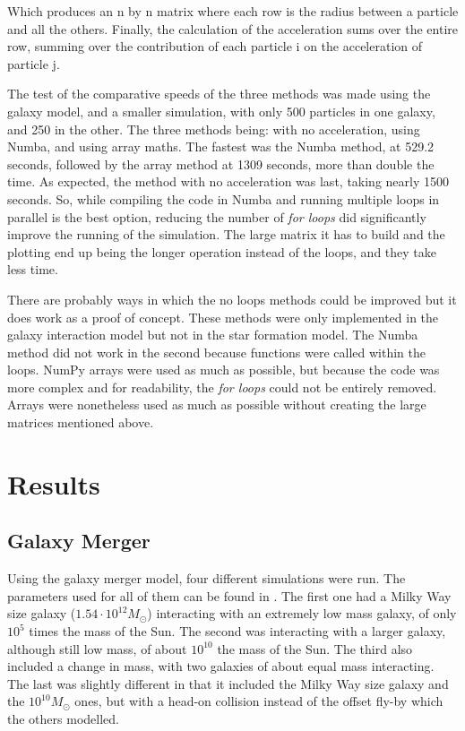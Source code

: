 \documentclass[a4paper,12pt]{article}
\begin{document}
Which produces an n by n matrix where each row is the radius between a particle and all the others. Finally, the calculation of the acceleration sums over the entire row, summing over the contribution of each particle i on the acceleration of particle j.\newline

The test of the comparative speeds of the three methods was made using the galaxy model, and a smaller simulation, with only 500 particles in one galaxy, and 250 in the other. The three methods being: with no acceleration, using Numba, and using array maths. The fastest was the Numba method, at 529.2 seconds, followed by the array method at 1309 seconds, more than double the time. As expected, the method with no acceleration was last, taking nearly 1500 seconds. So, while compiling the code in Numba and running multiple loops in parallel is the best option, reducing the number of \textit{for loops} did significantly improve the running of the simulation. The large matrix it has to build and the plotting end up being the longer operation instead of the loops, and they take less time.

There are probably ways in which the no loops methods could be improved but it does work as a proof of concept. These methods were only implemented in the galaxy interaction model but not in the star formation model. The Numba method did not work in the second because functions were called within the loops. NumPy arrays were used as much as possible, but because the code was more complex and for readability, the \textit{for loops} could not be entirely removed. Arrays were nonetheless used as much as possible without creating the large matrices mentioned above.

\section{Results}\label{sec:res}
\subsection{Galaxy Merger}

Using the galaxy merger model, four different simulations were run. The parameters used for all of them can be found in . The first one had a Milky Way size galaxy ($1.54\cdot10^{12}M_\odot$) interacting with an extremely low mass galaxy, of only $10^5$ times the mass of the Sun. The second was interacting with a larger galaxy, although still low mass, of about $10^{10}$ the mass of the Sun. The third also included a change in mass, with two galaxies of about equal mass interacting. The last was slightly different in that it included the Milky Way size galaxy and the $10^{10}M_\odot$ ones, but with a head-on collision instead of the offset fly-by which the others modelled.\newline
\end{document}
